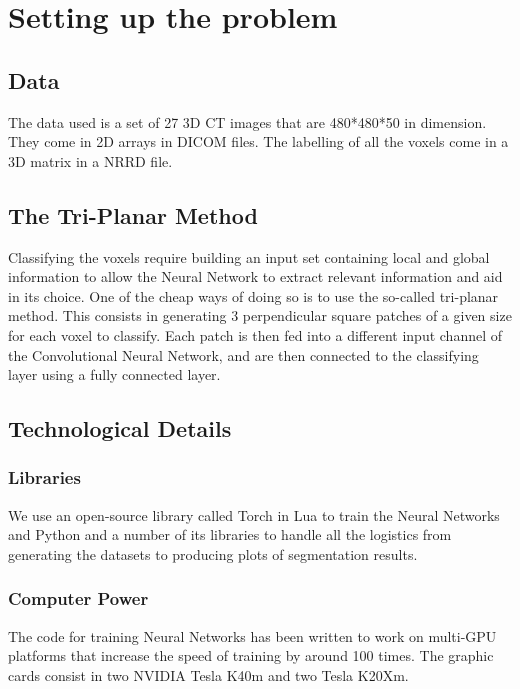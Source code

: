 \chapter{Setting up the problem}

\section{Data}

The data used is a set of 27 3D CT images that are 480*480*50 in dimension. They come in 2D arrays in DICOM files. The labelling of all the voxels come in a 3D matrix in a NRRD file.

\section{The Tri-Planar Method}

Classifying the voxels require building an input set containing local and global information to allow the Neural Network to extract relevant information and aid in its choice. One of the cheap ways of doing so is to use the so-called tri-planar method. This consists in generating 3 perpendicular square patches of a given size for each voxel to classify. Each patch is then fed into a different input channel of the Convolutional Neural Network, and are then connected to the classifying layer using a fully connected layer.

\section{Technological Details}

\subsection{Libraries}

We use an open-source library called Torch in Lua to train the Neural Networks and Python and a number of its libraries to handle all the logistics from generating the datasets to producing plots of segmentation results.

\subsection{Computer Power}

The code for training Neural Networks has been written to work on multi-GPU platforms that increase the speed of training by around 100
times. The graphic cards consist in two NVIDIA Tesla K40m and two Tesla K20Xm.

